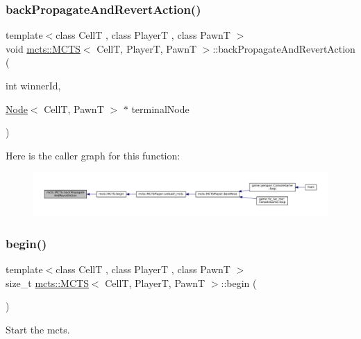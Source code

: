 \subsubsection{\texorpdfstring{back\+Propagate\+And\+Revert\+Action()}{backPropagateAndRevertAction()}}
{\footnotesize\ttfamily template$<$class CellT , class PlayerT , class PawnT $>$ \\
void \hyperlink{classmcts_1_1_m_c_t_s}{mcts\+::\+M\+C\+TS}$<$ CellT, PlayerT, PawnT $>$\+::back\+Propagate\+And\+Revert\+Action (\begin{DoxyParamCaption}\item[{int}]{winner\+Id,  }\item[{\hyperlink{structmcts_1_1_node}{Node}$<$ CellT, PawnT $>$ $\ast$}]{terminal\+Node }\end{DoxyParamCaption})\hspace{0.3cm}{\ttfamily [protected]}}

Here is the caller graph for this function\+:
\nopagebreak
\begin{figure}[H]
\begin{center}
\leavevmode
\includegraphics[width=350pt]{classmcts_1_1_m_c_t_s_a53275dba0c93543b2fa8c24ad928e4a8_icgraph}
\end{center}
\end{figure}
\mbox{\label{classmcts_1_1_m_c_t_s_ae8b2818e7a34e858e9dd284d33bca874}} 
\subsubsection{\texorpdfstring{begin()}{begin()}}
{\footnotesize\ttfamily template$<$class CellT , class PlayerT , class PawnT $>$ \\
size\+\_\+t \hyperlink{classmcts_1_1_m_c_t_s}{mcts\+::\+M\+C\+TS}$<$ CellT, PlayerT, PawnT $>$\+::begin (\begin{DoxyParamCaption}{ }\end{DoxyParamCaption})}



Start the mcts. 

